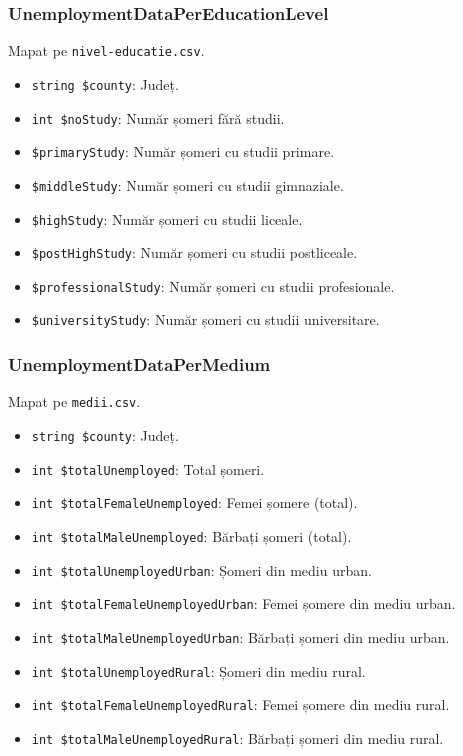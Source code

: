 \documentclass[12pt,a4paper]{article}
\begin{document}
\subsubsection{UnemploymentDataPerEducationLevel}
Mapat pe \texttt{nivel-educatie.csv}.
\begin{itemize}
	\item \texttt{string \$county}: Județ.
	\item \texttt{int \$noStudy}: Număr șomeri fără studii.
	\item \texttt{\$primaryStudy}: Număr șomeri cu studii primare. 
	\item \texttt{\$middleStudy}: Număr șomeri cu studii gimnaziale. 
	\item \texttt{\$highStudy}: Număr șomeri cu studii liceale. 
	\item \texttt{\$postHighStudy}: Număr șomeri cu studii postliceale. 
	\item \texttt{\$professionalStudy}: Număr șomeri cu studii profesionale. 
	\item \texttt{\$universityStudy}: Număr șomeri cu studii universitare.
\end{itemize}

\subsubsection{UnemploymentDataPerMedium}
Mapat pe \texttt{medii.csv}.
\begin{itemize}
    \item \texttt{string \$county}: Județ.
    \item \texttt{int \$totalUnemployed}: Total șomeri.
    \item \texttt{int \$totalFemaleUnemployed}: Femei șomere (total).
    \item \texttt{int \$totalMaleUnemployed}: Bărbați șomeri (total).
    \item \texttt{int \$totalUnemployedUrban}: Șomeri din mediu urban.
    \item \texttt{int \$totalFemaleUnemployedUrban}: Femei șomere din mediu urban.
    \item \texttt{int \$totalMaleUnemployedUrban}: Bărbați șomeri din mediu urban.
    \item \texttt{int \$totalUnemployedRural}: Șomeri din mediu rural.
    \item \texttt{int \$totalFemaleUnemployedRural}: Femei șomere din mediu rural.
    \item \texttt{int \$totalMaleUnemployedRural}: Bărbați șomeri din mediu rural.
\end{itemize}
\end{document}
